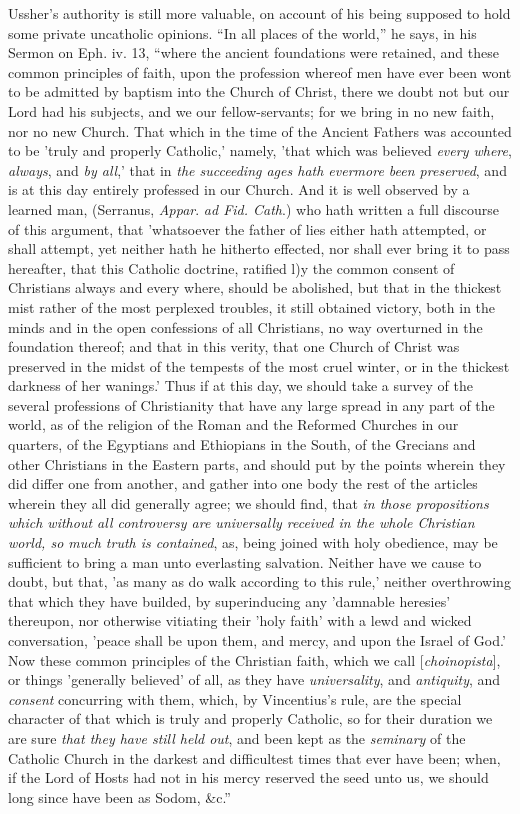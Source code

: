 Ussher's
authority is still more valuable, on account of his being supposed to
hold some private uncatholic opinions. ``In all places of the world,''
he says, in his Sermon on Eph. iv. 13, ``where the ancient foundations
were retained, and these common principles of faith, upon the profession
whereof men have ever been wont to be admitted by baptism into the
Church of Christ, there we doubt not but our Lord had his subjects, and
we our fellow-servants; for we bring in no new faith, nor no new Church.
That which in the time of the Ancient Fathers was accounted to be 'truly and properly Catholic,' namely,
'that which was believed \emph{every
where}, \emph{always}, and \emph{by all},' that in \emph{the
succeeding ages hath evermore been preserved}, and is at this day
entirely professed in our Church. And it is well observed by a learned
man, (Serranus, \emph{Appar}. \emph{ad Fid. Cath}.) who hath written a
full discourse of this argument, that 'whatsoever the father of lies
either hath attempted, or shall attempt, yet neither hath he hitherto
effected, nor shall ever bring it to pass hereafter, that this Catholic
doctrine, ratified l)y the common consent of Christians always and every
where, should be abolished, but that in the thickest mist rather of the
most perplexed troubles, it still obtained victory, both in the minds
and in the open confessions of all Christians, no way overturned in the
foundation thereof; and that in this verity, that one Church of Christ
was preserved in the midst of the tempests of the most cruel winter, or
in the thickest darkness of her wanings.' Thus if at this day, we
should take a survey of the several professions of Christianity that
have any large spread in any part of the world, as of the religion of
the Roman and the Reformed Churches in our quarters, of the Egyptians
and Ethiopians in the South, of the Grecians and other Christians in the
Eastern parts, and should put by the points wherein they did differ one
from another, and gather into one body the rest of the articles wherein
they all did generally agree; we should find, that \emph{in those
propositions which without all controversy are universally received in
the whole Christian world, so much truth is contained}, as, being
joined with holy obedience, may be sufficient to bring a man unto
everlasting salvation. Neither have we cause to doubt, but that, 'as
many as do walk according to this rule,' neither overthrowing that
which they have builded, by superinducing any 'damnable heresies'
thereupon, nor otherwise vitiating their 'holy faith' with a lewd
and wicked conversation, 'peace shall be upon them, and mercy, and
upon the Israel of God.' Now these common principles of the Christian
faith, which we call [\emph{choinopista}], or things 'generally
believed' of all, as they have \emph{universality}, and \emph{antiquity},
and \emph{consent} concurring with them, which, by Vincentius's rule,
are the special character of that which is truly and properly Catholic,
so for their duration we are sure \emph{that they have still held out},
and been kept as the \emph{seminary} of the Catholic Church in the
darkest and difficultest times that ever have been; when, if the Lord of
Hosts had not in his mercy reserved the seed unto us, we should long
since have been as Sodom, \&c.''

